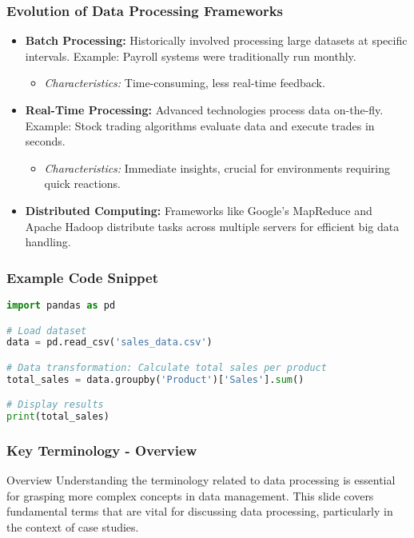 \documentclass[aspectratio=169]{beamer}
\begin{document}
\begin{frame}[fragile]
    \frametitle{Evolution of Data Processing Frameworks}
    \begin{itemize}
        \item \textbf{Batch Processing:} 
        Historically involved processing large datasets at specific intervals. Example: Payroll systems were traditionally run monthly.
        \begin{itemize}
            \item \textit{Characteristics:} Time-consuming, less real-time feedback.
        \end{itemize}
        
        \item \textbf{Real-Time Processing:}
        Advanced technologies process data on-the-fly. Example: Stock trading algorithms evaluate data and execute trades in seconds.
        \begin{itemize}
            \item \textit{Characteristics:} Immediate insights, crucial for environments requiring quick reactions.
        \end{itemize}
        
        \item \textbf{Distributed Computing:}
        Frameworks like Google’s MapReduce and Apache Hadoop distribute tasks across multiple servers for efficient big data handling.
    \end{itemize}
\end{frame}

\begin{frame}[fragile]
    \frametitle{Example Code Snippet}
    \begin{lstlisting}[language=Python, basicstyle=\ttfamily\small]
import pandas as pd

# Load dataset
data = pd.read_csv('sales_data.csv')

# Data transformation: Calculate total sales per product
total_sales = data.groupby('Product')['Sales'].sum()

# Display results
print(total_sales)
    \end{lstlisting}
\end{frame}

\begin{frame}[fragile]
    \frametitle{Key Terminology - Overview}
    \begin{block}{Overview}
        Understanding the terminology related to data processing is essential for grasping more complex concepts in data management. 
        This slide covers fundamental terms that are vital for discussing data processing, particularly in the context of case studies.
    \end{block}
\end{frame}
\end{document}
